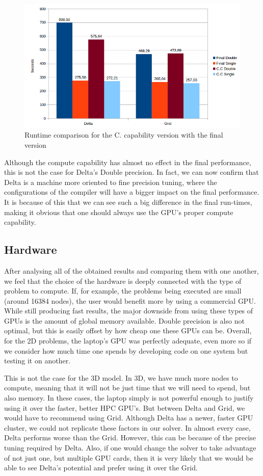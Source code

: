 \documentclass[12pt, openany]{book}
\begin{document}
  \begin{figure}[H]
  	\centering
  	\includegraphics[width=\linewidth]{Resources/Images/cc3d.png}
  	\caption{Runtime comparison for the C. capability version with the final version}
  	\label{fig:cc3d}
  \end{figure}
  
  Although the compute capability has almost no effect in the final performance, this is not the case for Delta's Double precision. In fact, we can now confirm that Delta is a machine more oriented to fine precision tuning, where the configurations of the compiler will have a bigger impact on the final performance. It is because of this that we can see such a big difference in the final run-times, making it obvious that one should always use the GPU's proper compute capability.

\subsection{Hardware}
After analysing all of the obtained results and comparing them with one another, we feel that the choice of the hardware is deeply connected with the type of problem to compute. If, for example, the problems being executed are small (around 16384 nodes), the user would benefit more by using a commercial GPU. While still producing fast results, the major downside from using these types of GPUs is the amount of global memory available. Double precision is also not optimal, but this is easily offset by how cheap one these GPUs can be. Overall, for the 2D problems, the laptop's GPU was perfectly adequate, even more so if we consider how much time one spends by developing code on one system but testing it on another. \par
This is not the case for the 3D model. In 3D, we have much more nodes to compute, meaning that it will not be just time that we will need to spend, but also memory. In these cases, the laptop simply is not powerful enough to justify using it over the faster, better HPC GPU's. But between Delta and Grid, we would have to recommend using Grid. Although Delta has a newer, faster GPU cluster, we could not replicate these factors in our solver. In almost every case, Delta performs worse than the Grid. However, this can be because of the precise tuning required by Delta. Also, if one would change the solver to take advantage of not just one, but multiple GPU cards, then it is very likely that we would be able to see Delta's potential and prefer using it over the Grid.
\end{document}

